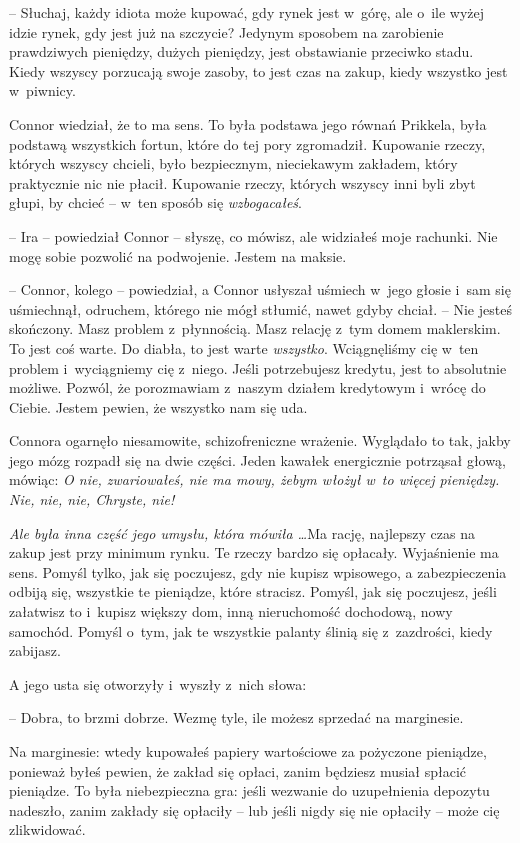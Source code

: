 \documentclass[oneside,polish,11pt,rmheadings]{mwbk}
\begin{document}
-- Słuchaj, każdy idiota może kupować, gdy rynek jest w~górę, ale o~ile wyżej idzie rynek, gdy jest już na szczycie? Jedynym sposobem na zarobienie prawdziwych pieniędzy, dużych pieniędzy, jest obstawianie przeciwko stadu. Kiedy wszyscy porzucają swoje zasoby, to jest czas na zakup, kiedy wszystko jest w~piwnicy.

Connor wiedział, że to ma sens. To była podstawa jego równań Prikkela, była podstawą wszystkich fortun, które do tej pory zgromadził. Kupowanie rzeczy, których wszyscy chcieli, było bezpiecznym, nieciekawym zakładem, który praktycznie nic nie płacił. Kupowanie rzeczy, których wszyscy inni byli zbyt głupi, by chcieć -- w~ten sposób się \textit{wzbogacałeś}.

-- Ira -- powiedział Connor -- słyszę, co mówisz, ale widziałeś moje rachunki. Nie mogę sobie pozwolić na podwojenie. Jestem na maksie.

-- Connor, kolego -- powiedział, a Connor usłyszał uśmiech w~jego głosie i~sam się uśmiechnął, odruchem, którego nie mógł stłumić, nawet gdyby chciał. -- Nie jesteś skończony. Masz problem z~płynnością. Masz relację z~tym domem maklerskim. To jest coś warte. Do diabła, to jest warte \textit{wszystko}. Wciągnęliśmy cię w~ten problem i~wyciągniemy cię z~niego. Jeśli potrzebujesz kredytu, jest to absolutnie możliwe. Pozwól, że porozmawiam z~naszym działem kredytowym i~wrócę do Ciebie. Jestem pewien, że wszystko nam się uda.

Connora ogarnęło niesamowite, schizofreniczne wrażenie. Wyglądało to tak, jakby jego mózg rozpadł się na dwie części. Jeden kawałek energicznie potrząsał głową, mówiąc: \textit{O nie, zwariowałeś, nie ma mowy, żebym włożył w~to więcej pieniędzy. Nie, nie, nie, Chryste, nie! }

\textit{Ale była inna część jego umysłu, która mówiła \ldots }Ma rację, najlepszy czas na zakup jest przy minimum rynku. Te rzeczy bardzo się opłacały. Wyjaśnienie ma sens. Pomyśl tylko, jak się poczujesz, gdy nie kupisz wpisowego, a zabezpieczenia odbiją się, wszystkie te pieniądze, które stracisz. Pomyśl, jak się poczujesz, jeśli załatwisz to i~kupisz większy dom, inną nieruchomość dochodową, nowy samochód. Pomyśl o~tym, jak te wszystkie palanty ślinią się z~zazdrości, kiedy zabijasz. 

A jego usta się otworzyły i~wyszły z~nich słowa: 

-- Dobra, to brzmi dobrze. Wezmę tyle, ile możesz sprzedać na marginesie. 

Na marginesie: wtedy kupowałeś papiery wartościowe za pożyczone pieniądze, ponieważ byłeś pewien, że zakład się opłaci, zanim będziesz musiał spłacić pieniądze. To była niebezpieczna gra: jeśli wezwanie do uzupełnienia depozytu nadeszło, zanim zakłady się opłaciły -- lub jeśli nigdy się nie opłaciły -- może cię zlikwidować.
\end{document}
